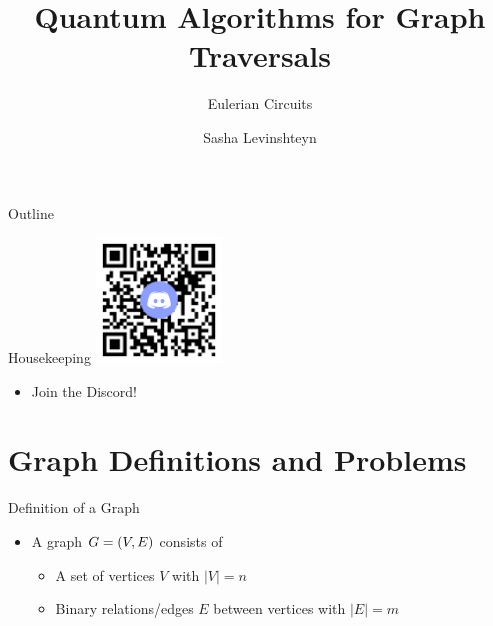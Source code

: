 \documentclass[aspectratio=169, handout]{beamer}
\title{Quantum Algorithms for Graph Traversals}
\subtitle{Eulerian Circuits}
\author{Sasha Levinshteyn}
\date{}
\begin{document}

\begin{frame}
\titlepage
\end{frame}

\begin{frame}{Outline}
  \tableofcontents
\end{frame}


\begin{frame}{Housekeeping}
    \centering\includegraphics[width=0.25\textwidth]{qr-code.png}
    \begin{itemize}
        \item Join the Discord!
    \end{itemize}
\end{frame}


\section{Graph Definitions and Problems}
\frame{\sectionpage}


\begin{frame}{Definition of a Graph}
    \begin{itemize}
        \item A graph $\emph{G} = (V, E)$ consists of
        \begin{itemize}
            \item A set of vertices $V$ with $|V| = n$
            \item Binary relations/edges $E$ between vertices with $|E| = m$
        \end{itemize}
    \end{itemize}
    \pause
    \begin{center}
    \end{center}
\end{frame}
\end{document}
